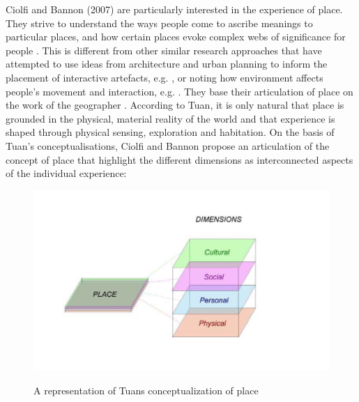 
Ciolfi and Bannon (2007) are particularly interested in the experience of place. They strive to understand the ways people come to ascribe meanings to particular places, and how certain places evoke complex webs of significance for people \autocite[p. 160]{hybridplace_ciolfi}. This is different from other similar research approaches that have attempted to use ideas from architecture and urban planning to inform the placement of interactive artefacts, e.g. \autocite{Cullen_book}, or noting how environment affects people's movement and interaction, e.g. \autocite{Alexander_book}. They base their articulation of place on the work of the geographer \autocite{Tuan_book}. According to Tuan, it is only natural that place is grounded in the physical, material reality of the world and that experience is shaped through physical sensing, exploration and habitation. On the basis of Tuan's conceptualisations, Ciolfi and Bannon propose an articulation of the concept of place that highlight the different dimensions as interconnected aspects of the individual experience:

\begin{figure}[H]
\includegraphics[width=12cm]{pictures/tuans_dimensions.png}
\caption{A representation of Tuans conceptualization of place}
\centering 
\autocite[p. 224]{spaceplace_ciolfi}
\end{figure}

